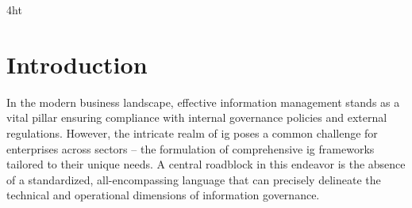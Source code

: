 \documentclass[
  a4paper,  %
  twoside,  %
  bibliography=totoc,
  headsepline,
  cleardoublepage=empty,
  parskip=half,
  draft=false
]{scrbook}
\begin{document}
\listoffigures
\listoftables

\ifdeutsch
\else
\fi

\ifdeutsch
\else
\fi

\printnoidxglossaries

\iftex4ht
\else
\fi



\renewcommand*{\chapterpagestyle}{scrplain}
\pagestyle{scrheadings}
\pagestyle{scrheadings}
\ihead[]{}
\chead[]{}
\ohead[]{\headmark}
\cfoot[]{}
\ifoot[]{}

































%
%


\chapter{Introduction}
In the modern business landscape, effective information management stands as a vital pillar ensuring compliance with internal governance policies and external regulations. However, the intricate realm of \acrfull{ig} poses a common challenge for enterprises across sectors – the formulation of comprehensive \acrshort{ig} frameworks tailored to their unique needs. A central roadblock in this endeavor is the absence of a standardized, all-encompassing language that can precisely delineate the technical and operational dimensions of information governance.
\end{document}
